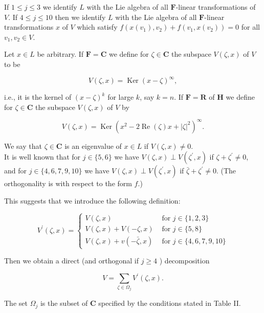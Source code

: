 \documentclass[10pt]{article}
\begin{document}
If $1 \leqslant j \leqslant 3$ we identify $L$ with the Lie algebra of all $\mathbf{F}$-linear transformations of $V$. If $4 \leqslant j \leqslant 10$ then we identify $L$ with the Lie algebra of all $\mathbf{F}$-linear transformations $x$ of $V$ which satisfy $f\left(x\left(v_{1}\right), v_{2}\right)+f\left(v_{1}, x\left(v_{2}\right)\right)=0$ for all $v_{1}, v_{2} \in V$.

Let $x \in L$ be arbitrary. If $\mathbf{F}=\mathbf{C}$ we define for $\zeta \in \mathbf{C}$ the subspace $V(\zeta, x)$ of $V$ to be

$$
V(\zeta, x)=\operatorname{Ker}(x-\zeta)^{\infty},
$$

i.e., it is the kernel of $(x-\zeta)^{k}$ for large $k$, say $k=n$. If $\mathbf{F}=\mathbf{R}$ of $\mathbf{H}$ we define for $\zeta \in \mathbf{C}$ the subspace $V(\zeta, x)$ of $V$ by

$$
V(\zeta, x)=\operatorname{Ker}\left(x^{2}-2 \operatorname{Re}(\zeta) x+|\zeta|^{2}\right)^{\infty} .
$$

We say that $\zeta \in \mathbf{C}$ is an eigenvalue of $x \in L$ if $V(\zeta, x) \neq 0$.\\
It is well known that for $j \in\{5,6\}$ we have $V(\zeta, x) \perp V\left(\zeta^{\prime}, x\right)$ if $\zeta+\zeta^{\prime} \neq 0$, and for $j \in\{4,6,7,9,10\}$ we have $V(\zeta, x) \perp V\left(\zeta^{\prime}, x\right)$ if $\bar{\zeta}+\zeta^{\prime} \neq 0$. (The orthogonality is with respect to the form $f$.)

This suggests that we introduce the following definition:

$$
V^{\prime}(\zeta, x)= \begin{cases}V(\zeta, x) & \text { for } j \in\{1,2,3\} \\ V(\zeta, x)+V(-\zeta, x) & \text { for } j \in\{5,8\} \\ V(\zeta, x)+v(-\bar{\zeta}, x) & \text { for } j \in\{4,6,7,9,10\}\end{cases}
$$

Then we obtain a direct (and orthogonal if $j \geqslant 4$ ) decomposition


\begin{equation*}
V=\sum_{\zeta \in \Omega_{j}} V^{\prime}(\zeta, x) . \tag{2.1}
\end{equation*}


The set $\Omega_{j}$ is the subset of $\mathbf{C}$ specified by the conditions stated in Table II.
\end{document}
